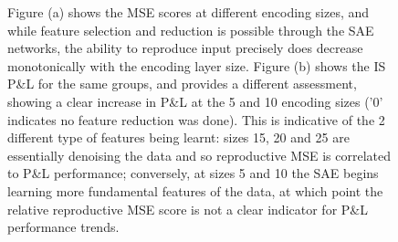 \documentclass[a4paper,11pt,oneside]{article}
\theoremstyle{plain}
\theoremstyle{definition}
\begin{document}
\begin{figure}[H]
{		\newline Figure (a) shows the MSE scores at different encoding sizes, and while feature selection and reduction is possible through the SAE networks, the ability to reproduce input precisely does decrease monotonically with the encoding layer size. Figure (b) shows the IS P\&L for the same groups, and provides a different assessment, showing a clear increase in P\&L at the 5 and 10 encoding sizes ('0' indicates no feature reduction was done). This is indicative of the 2 different type of features being learnt: sizes 15, 20 and 25 are essentially denoising the data and so reproductive MSE is correlated to P\&L performance; conversely, at sizes 5 and 10 the SAE begins learning more fundamental features of the data, at which point the relative reproductive MSE score is not a clear indicator for P\&L performance trends.}
	\end{figure}
	
\end{document}
